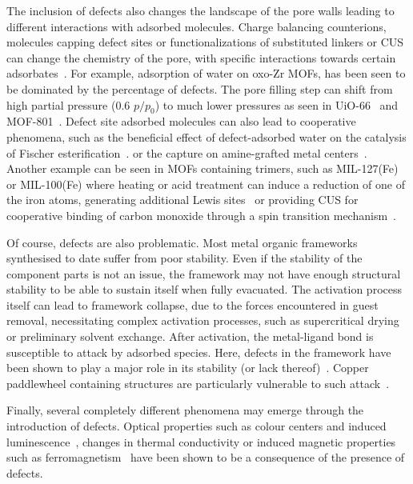 The inclusion of defects also changes the landscape of the pore
walls leading to different interactions with adsorbed molecules.
Charge balancing counterions, molecules capping defect sites or
functionalizations of substituted linkers or CUS can change the
chemistry of the pore, with specific interactions towards certain
adsorbates~\cite{dissegnaUsingWaterAdsorption2017}.
For example, adsorption of water on oxo-Zr MOFs, has been seen to
be dominated by the percentage of defects. The pore filling step can
shift from high partial pressure (0.6 \(p/p_0\)) to much lower pressures
as seen in UiO-66~\cite{ghoshWaterAdsorptionUiO662014} and
MOF-801~\cite{choiRoleStructuralDefects2018}. Defect site adsorbed
molecules can also lead to cooperative phenomena,
such as the beneficial effect of defect-adsorbed water on the
catalysis of Fischer esterification~\cite{caratelliNatureActiveSites2017}.
or the  capture on amine-grafted metal 
centers~\cite{mcdonaldCooperativeInsertionCO22015}.
Another example can be seen in MOFs containing  trimers,
such as MIL-127(Fe) or MIL-100(Fe) where heating or acid treatment
can induce a reduction of one of the iron atoms, generating
additional Lewis sites~\cite{yoonControlledReducibilityMetalOrganic2010}
or providing CUS for cooperative binding of carbon monoxide through
a spin transition mechanism~\cite{reedSpinTransitionMechanism2017}.

Of course, defects are also problematic. Most metal organic frameworks
synthesised to date suffer from poor stability. Even if the stability
of the component parts is not an issue, the framework may not have
enough structural stability to be able to sustain itself when fully
evacuated. The activation process itself can lead to framework
collapse, due to the forces encountered in guest removal, necessitating
complex activation processes, such as supercritical drying or
preliminary solvent exchange. After activation, the metal-ligand bond
is susceptible to attack by adsorbed species. Here, defects in the framework
have been shown to play a major role in its stability (or lack
thereof)~\cite{burtchWaterStabilityAdsorption2014}.
Copper paddlewheel containing structures are particularly vulnerable to
such attack~\cite{alvarezStructureStabilityHKUST12017}.

Finally, several completely different phenomena may emerge through
the introduction of defects. Optical properties such as colour
centers and induced luminescence~\cite{mullerDefectsColorCenters2017},
changes in thermal conductivity or induced magnetic properties
such as ferromagnetism~\cite{shenOriginLongRangeFerromagnetic2012}
have been shown to be a consequence of the presence of defects.

